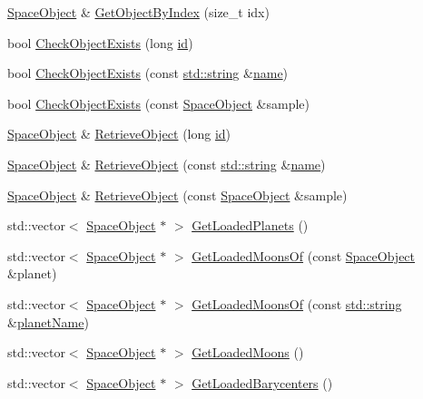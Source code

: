 \begin{DoxyCompactItemize}
\item 
\hyperlink{class_space_object}{Space\+Object} \& \hyperlink{class_app_af6e4143b4dabe6ea635099dda0bb531e}{Get\+Object\+By\+Index} (size\+\_\+t idx)
\item 
bool \hyperlink{class_app_a362e000126120fd4f6ce12ba75d47945}{Check\+Object\+Exists} (long \hyperlink{glext_8h_a58c2a664503e14ffb8f21012aabff3e9}{id})
\item 
bool \hyperlink{class_app_ad2700c102cb00a025ec1e17b178d287d}{Check\+Object\+Exists} (const \hyperlink{glext_8h_ae84541b4f3d8e1ea24ec0f466a8c568b}{std\+::string} \&\hyperlink{glext_8h_ad977737dfc9a274a62741b9500c49a32}{name})
\item 
bool \hyperlink{class_app_aa34a12b23a2f5c69c8e9d440df37a4a9}{Check\+Object\+Exists} (const \hyperlink{class_space_object}{Space\+Object} \&sample)
\item 
\hyperlink{class_space_object}{Space\+Object} \& \hyperlink{class_app_a863d8814f100aecf3a204677fe64c71d}{Retrieve\+Object} (long \hyperlink{glext_8h_a58c2a664503e14ffb8f21012aabff3e9}{id})
\item 
\hyperlink{class_space_object}{Space\+Object} \& \hyperlink{class_app_a82ab292df58ac850fcc5d29d3961884c}{Retrieve\+Object} (const \hyperlink{glext_8h_ae84541b4f3d8e1ea24ec0f466a8c568b}{std\+::string} \&\hyperlink{glext_8h_ad977737dfc9a274a62741b9500c49a32}{name})
\item 
\hyperlink{class_space_object}{Space\+Object} \& \hyperlink{class_app_a8fe52303bcef03a0482d680ce9f2b431}{Retrieve\+Object} (const \hyperlink{class_space_object}{Space\+Object} \&sample)
\item 
std\+::vector$<$ \hyperlink{class_space_object}{Space\+Object} $\ast$ $>$ \hyperlink{class_app_a182106fc2c4faaaee41c167953bbe35e}{Get\+Loaded\+Planets} ()
\item 
std\+::vector$<$ \hyperlink{class_space_object}{Space\+Object} $\ast$ $>$ \hyperlink{class_app_abd9836f44c32188ded4a2868526d1451}{Get\+Loaded\+Moons\+Of} (const \hyperlink{class_space_object}{Space\+Object} \&planet)
\item 
std\+::vector$<$ \hyperlink{class_space_object}{Space\+Object} $\ast$ $>$ \hyperlink{class_app_a22ba61abf8eefa49d514933cbeb65445}{Get\+Loaded\+Moons\+Of} (const \hyperlink{glext_8h_ae84541b4f3d8e1ea24ec0f466a8c568b}{std\+::string} \&\hyperlink{_routine_8cpp_a1cc303acbb3ff05d12048e9caaa58081}{planet\+Name})
\item 
std\+::vector$<$ \hyperlink{class_space_object}{Space\+Object} $\ast$ $>$ \hyperlink{class_app_ad6b106d39f3033f9707644f018e66478}{Get\+Loaded\+Moons} ()
\item 
std\+::vector$<$ \hyperlink{class_space_object}{Space\+Object} $\ast$ $>$ \hyperlink{class_app_afe8189e6c77a3a8b90fa9cfc6f2d9cd5}{Get\+Loaded\+Barycenters} ()
\end{DoxyCompactItemize}


